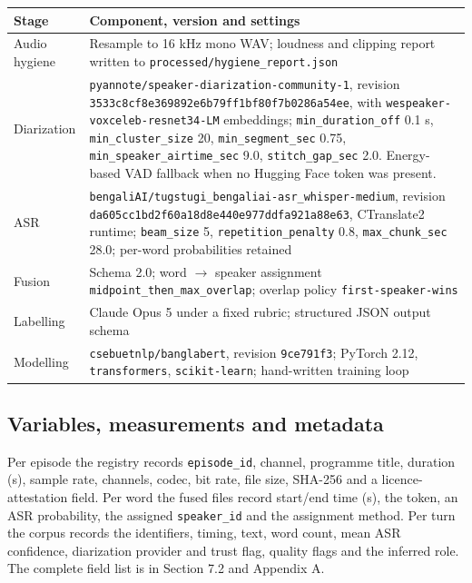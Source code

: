 \documentclass[11pt,a4paper]{article}
\newcommand{\thd}[1]{\textbf{\sffamily\small #1}}          %
\begin{document}
\begin{tabularx}{\textwidth}{|L{3.4cm}|Y|}
\hline
\thd{Stage} & \thd{Component, version and settings} \\ \hline
Audio hygiene & Resample to 16 kHz mono WAV; loudness and clipping report written to
\texttt{processed/hygiene\_report.json} \\ \hline
Diarization & \texttt{pyannote/speaker-diarization-community-1}, revision
\texttt{3533c8cf8e369892e6b79ff1bf80f7b0286a54ee}, with
\texttt{wespeaker-voxceleb-resnet34-LM} embeddings; \texttt{min\_duration\_off} 0.1 s,
\texttt{min\_cluster\_size} 20, \texttt{min\_segment\_sec} 0.75,
\texttt{min\_speaker\_airtime\_sec} 9.0, \texttt{stitch\_gap\_sec} 2.0. Energy-based VAD fallback
when no Hugging Face token was present. \\ \hline
ASR & \texttt{bengaliAI/tugstugi\_bengaliai-asr\_whisper-medium}, revision
\texttt{da605cc1bd2f60a18d8e440e977ddfa921a88e63}, CTranslate2 runtime; \texttt{beam\_size} 5,
\texttt{repetition\_penalty} 0.8, \texttt{max\_chunk\_sec} 28.0; per-word probabilities retained \\ \hline
Fusion & Schema 2.0; word $\rightarrow$ speaker assignment
\texttt{midpoint\_then\_max\_overlap}; overlap policy \texttt{first-speaker-wins} \\ \hline
Labelling & Claude Opus 5 under a fixed rubric; structured JSON output schema \\ \hline
Modelling & \texttt{csebuetnlp/banglabert}, revision \texttt{9ce791f3}; PyTorch 2.12,
\texttt{transformers}, \texttt{scikit-learn}; hand-written training loop \\ \hline
\end{tabularx}

\subsection{Variables, measurements and metadata}

Per episode the registry records \texttt{episode\_id}, channel, programme title, duration (s),
sample rate, channels, codec, bit rate, file size, SHA-256 and a licence-attestation field. Per
word the fused files record start/end time (s), the token, an ASR probability, the assigned
\texttt{speaker\_id} and the assignment method. Per turn the corpus records the identifiers,
timing, text, word count, mean ASR confidence, diarization provider and trust flag, quality flags
and the inferred role. The complete field list is in Section 7.2 and Appendix A.
\end{document}
